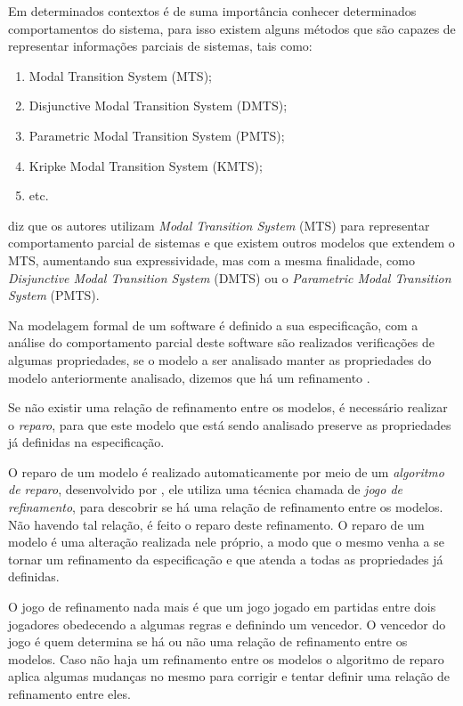 Em determinados contextos é de suma importância conhecer determinados comportamentos do sistema, para isso existem alguns métodos que são capazes de representar informações parciais de sistemas, tais como:

\begin{enumerate}
\item Modal Transition System (MTS);
\item Disjunctive Modal Transition System (DMTS);
\item Parametric Modal Transition System (PMTS);
\item Kripke Modal Transition System (KMTS);
\item etc.
\end{enumerate}

\cite{machado2017uso} diz que os autores utilizam \textit{Modal Transition System} (MTS) para representar comportamento parcial de sistemas e que existem outros modelos que extendem o MTS, aumentando sua expressividade, mas com a mesma finalidade, como \textit{Disjunctive Modal Transition System} (DMTS) ou o \textit{Parametric Modal Transition System} (PMTS).

Na modelagem formal de um software é definido a sua especificação, com a análise do comportamento parcial deste software são realizados verificações de algumas propriedades, se o modelo a ser analisado manter as propriedades do modelo anteriormente analisado, dizemos que há um refinamento \cite{machado2017uso}.

Se não existir uma relação de refinamento entre os modelos, é necessário realizar o \textit{reparo}, para que este modelo que está sendo analisado preserve as propriedades já definidas na especificação.

O reparo de um modelo é realizado automaticamente por meio de um \textit{algoritmo de reparo}, desenvolvido por \cite{machado2017uso}, ele utiliza uma técnica chamada de \textit{jogo de refinamento}, para descobrir se há uma relação de refinamento entre os modelos. Não havendo tal relação, é feito o reparo deste refinamento. O reparo de um modelo é uma alteração realizada nele próprio, a modo que o mesmo venha a se tornar um refinamento da especificação e que atenda a todas as propriedades já definidas.

O jogo de refinamento nada mais é que um jogo jogado em partidas entre dois jogadores obedecendo a algumas regras e definindo um vencedor. O vencedor do jogo é quem determina se há ou não uma relação de refinamento entre os modelos. Caso não haja um refinamento entre os modelos o algoritmo de reparo aplica algumas mudanças no mesmo para corrigir e tentar definir uma relação de refinamento entre eles.

